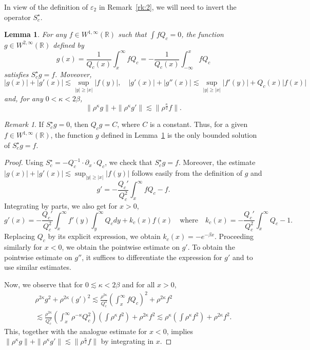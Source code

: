 \documentclass[11pt]{amsart}
\newtheorem{lemma}{Lemma}
\theoremstyle{remark}
\newtheorem{remark}{Remark}
\newcommand\RR{\mathbb{R}}
\newcommand\ep{\varepsilon}
\begin{document}
In view of the definition of $\ep_2$ in Remark~\ref{rk:2}, we will need to invert
the operator $S_c^\star$.

\begin{lemma}\label{le:03}
For any $f\in W^{1,\infty}(\RR)$ such that $\int f Q_c=0$, 
the function $g\in W^{2,\infty}(\RR)$ defined by
\[
g(x) = \frac 1{Q_c(x)} \int_x^\infty f Q_c = - \frac 1{Q_c(x)} \int_{-\infty}^x f Q_c
\]
satisfies $S_c^\star g=f$. Moveover,
\[
|g(x)|+|g'(x)|\lesssim \sup_{|y|\geq |x|} |f(y)|,
\quad|g'(x)|+|g''(x)|\lesssim \sup_{|y|\geq |x|} |f'(y)| + Q_c(x) |f(x)|
\]
and, for any $0<\kappa<2\beta$,
\[
\| \rho^\kappa g\| + \|\rho^\kappa g'\| 
\lesssim \|\rho^\frac\kappa2 f\|.
\]
\end{lemma}
\begin{remark}\label{rk:3}
If $S_c^\star g = 0$, then $Q_c g=C$, where $C$ is a constant.
Thus, for a given $f\in W^{1,\infty}(\RR)$, the function $g$ defined in Lemma~\ref{le:03} is the only bounded solution of $S_c^\star g = f$.
\end{remark}
\begin{proof}
Using $S_c^\star=-Q_c^{-1}\cdot \partial_x\cdot Q_c$, we check that $S_c^\star g=f$.
Moreover, 
the estimate $|g(x)|+|g'(x)|\lesssim \sup_{|y|\geq |x|} |f(y)|$ follows easily from the definition of $g$ and
\[
g' = -\frac{Q_c'}{Q_c^2}\int_x^\infty fQ_c-f.
\]
Integrating by parts, we also get for $x>0$,
\[
g'(x)= -\frac{Q_c'}{Q_c^2}\int_x^{\infty} f'(y) \int_y^\infty Q_c dy
+k_c(x) f(x)
\quad \mbox{where}\quad
k_c(x)= -\frac{Q_c'}{Q_c^2}\int_x^{\infty} Q_c -1.
\]
Replacing $Q_c$ by its explicit expression, we obtain
$k_c(x) = -e^{-\beta x}$. Proceeding similarly for $x<0$, we obtain the pointwise estimate on $g'$.
To obtain the pointwise estimate on $g''$, it suffices to differentiate the expression for $g'$
and to use similar estimates.

Now, we observe that for $0\lesssim \kappa<2\beta$ and for all $x>0$,
\begin{multline*}
\rho^{2\kappa} g^2
+\rho^{2\kappa} (g')^2\lesssim 
\frac{\rho^{2\kappa}}{Q_c^2}\left(\int_x^\infty f Q_c\right)^2
+\rho^{2\kappa}f^2\\
\lesssim \frac{\rho^{2\kappa}}{Q_c^2}\left(\int_x^\infty \rho^{-\kappa}Q_c^2\right) 
\left(\int \rho^{\kappa} f^2\right) +\rho^{2\kappa}f^2
\lesssim \rho^\kappa\left(\int \rho^\kappa f^2\right)+\rho^{2\kappa}f^2.
\end{multline*}
This, together with the analogue estimate for $x<0$, 
implies $\| \rho^\kappa g\| + \|\rho^\kappa g'\| 
\lesssim \|\rho^\frac\kappa2 f\|$ by integrating in $x$.
\end{proof}
\end{document}
